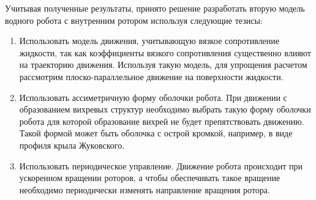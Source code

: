 Учитывая полученные результаты, принято решение разработать вторую модель водного робота с внутренним ротором используя следующие тезисы:

\begin{enumerate}
	\item Использовать модель движения, учитывающую вязкое сопротивление жидкости, так как коэффициенты вязкого сопротивления существенно влияют на траекторию движения. Используя такую модель, для упрощения расчетом рассмотрим плоско-параллельное движение на поверхности жидкости.
	
	\item Использовать ассиметричную форму оболочки робота. При движении с образованием вихревых структур необходимо выбрать такую форму оболочки робота для которой образование вихрей не будет препятствовать движению. Такой формой может быть оболочка с острой кромкой, например, в виде профиля крыла Жуковского.
	
	\item Использовать периодическое управление. Движение робота происходит при ускоренном вращении роторов, а чтобы обеспечивать такое вращение необходимо периодически изменять направление вращения ротора. 
	
\end{enumerate}


	
	
\clearpage